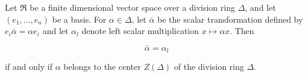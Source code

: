 Let $\mathfrak{R}$ be a finite dimensional vector space over a division ring $\Delta$, and let $(e_1, \dots, e_n)$ be a basis. For $\alpha \in \Delta$, let $\bar{\alpha}$ be the scalar transformation defined by $e_i \bar{\alpha} = \alpha e_i$ and let $\alpha_l$ denote left scalar multiplication $x \mapsto \alpha x$. Then

$$\bar{\alpha} = \alpha_l$$

if and only if $\alpha$ belongs to the center $Z(\Delta)$ of the division ring $\Delta$.
